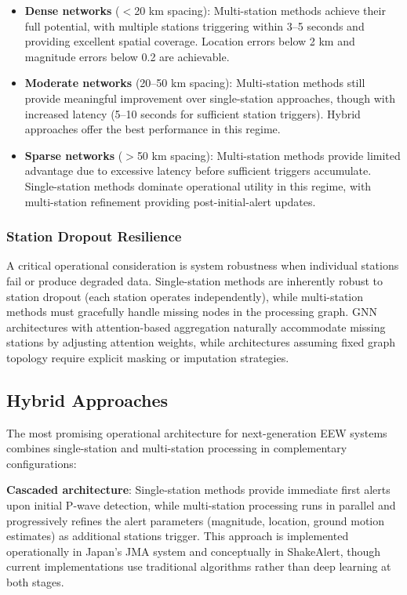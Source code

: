\documentclass[review,authoryear]{elsarticle}
\begin{document}
\begin{itemize}
\item \textbf{Dense networks} ($<$20 km spacing): Multi-station methods achieve their full potential, with multiple stations triggering within 3--5 seconds and providing excellent spatial coverage. Location errors below 2 km and magnitude errors below 0.2 are achievable.

\item \textbf{Moderate networks} (20--50 km spacing): Multi-station methods still provide meaningful improvement over single-station approaches, though with increased latency (5--10 seconds for sufficient station triggers). Hybrid approaches offer the best performance in this regime.

\item \textbf{Sparse networks} ($>$50 km spacing): Multi-station methods provide limited advantage due to excessive latency before sufficient triggers accumulate. Single-station methods dominate operational utility in this regime, with multi-station refinement providing post-initial-alert updates.
\end{itemize}

\subsubsection{Station Dropout Resilience}

A critical operational consideration is system robustness when individual stations fail or produce degraded data. Single-station methods are inherently robust to station dropout (each station operates independently), while multi-station methods must gracefully handle missing nodes in the processing graph. GNN architectures with attention-based aggregation \citep{velickovic2018graph} naturally accommodate missing stations by adjusting attention weights, while architectures assuming fixed graph topology require explicit masking or imputation strategies.

\subsection{Hybrid Approaches}
\label{sec:hybrid}

The most promising operational architecture for next-generation EEW systems combines single-station and multi-station processing in complementary configurations:

\textbf{Cascaded architecture}: Single-station methods provide immediate first alerts upon initial P-wave detection, while multi-station processing runs in parallel and progressively refines the alert parameters (magnitude, location, ground motion estimates) as additional stations trigger. This approach is implemented operationally in Japan's JMA system and conceptually in ShakeAlert, though current implementations use traditional algorithms rather than deep learning at both stages.
\end{document}

